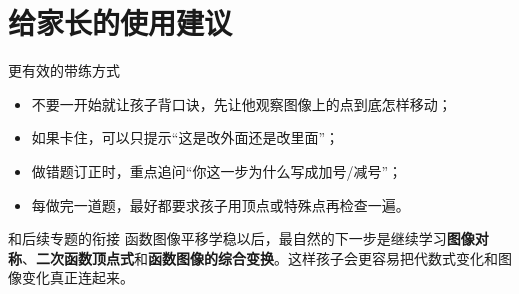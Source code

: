 \documentclass[11pt,a4paper,fontset=fandol]{ctexart}
\begin{document}
\section{给家长的使用建议}

\begin{warnbox}{更有效的带练方式}
\begin{itemize}
  \item 不要一开始就让孩子背口诀，先让他观察图像上的点到底怎样移动；
  \item 如果卡住，可以只提示“这是改外面还是改里面”；
  \item 做错题订正时，重点追问“你这一步为什么写成加号/减号”；
  \item 每做完一道题，最好都要求孩子用顶点或特殊点再检查一遍。
\end{itemize}
\end{warnbox}

\begin{infobox}{和后续专题的衔接}
函数图像平移学稳以后，最自然的下一步是继续学习\textbf{图像对称}、\textbf{二次函数顶点式}和\textbf{函数图像的综合变换}。这样孩子会更容易把代数式变化和图像变化真正连起来。
\end{infobox}
\end{document}
